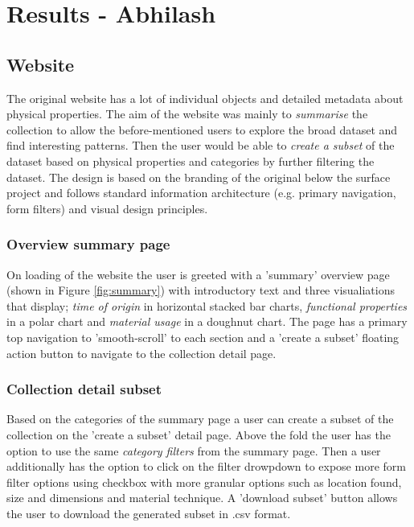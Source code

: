 \section{Results - Abhilash}

\subsection{Website}

The original website has a lot of individual objects and detailed metadata about physical properties. The aim of the website was mainly to \textit{summarise} the collection to allow the before-mentioned users to explore the broad dataset and find interesting patterns. Then the user would be able to  \textit{create a subset} of the dataset based on physical properties and categories by further filtering the dataset. The design is based on the branding of the original below the surface project and follows standard information architecture (e.g. primary navigation, form filters) and visual design principles.

\subsubsection{Overview summary page}
On loading of the website the user is greeted with a 'summary' overview page (shown in Figure \ref{fig:summary}) with introductory text and three visualiations that display; \textit{time of origin} in horizontal stacked bar charts, \textit{functional properties} in a polar chart and \textit{material usage} in a doughnut chart. The page has a primary top navigation to 'smooth-scroll' to each section and a 'create a subset' floating action button to navigate to the collection detail page.

\subsubsection{Collection detail subset}
Based on the categories of the summary page a user can create a subset of the collection on the 'create a subset' detail page. Above the fold the user has the option to use the same \textit{category filters} from the summary page. Then a user additionally has the option to click on the filter drowpdown to expose more form filter options using checkbox with more granular options such as location found, size and dimensions and material technique. A 'download subset' button allows the user to download the generated subset in .csv format.

